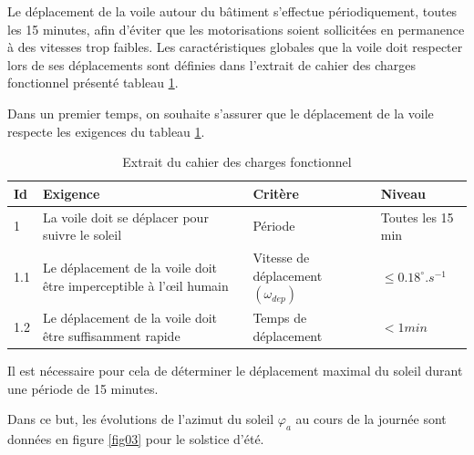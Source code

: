 Le déplacement de la voile autour du bâtiment s'effectue périodiquement, toutes les 15 minutes, afin d'éviter que les motorisations soient sollicitées en permanence à des vitesses trop faibles. Les caractéristiques globales que la voile doit respecter lors de ses déplacements sont définies dans l'extrait de cahier des charges fonctionnel présenté tableau \ref{tab01}.

Dans un premier temps, on souhaite s'assurer que le déplacement de la voile respecte les exigences du tableau \ref{tab01}.

\begin{table}[ht!]
\begin{tabular}{|p{}|p{}|p{}|p{}|}
\hline
Id & Exigence & Critère & Niveau\\
\hline
1 & La voile doit se déplacer pour suivre le soleil & Période & Toutes les 15 min\\
\hline
1.1 & Le déplacement de la voile doit être imperceptible à l'\oe il humain & Vitesse de déplacement $(\omega_{dep})$ & $\leq 0.18^{\circ}.s^{-1}$ \\
\hline
1.2 & Le déplacement de la voile doit être suffisamment rapide & Temps de déplacement & $<1min$\\
\hline
\end{tabular}
\caption{\label{tab01}Extrait du cahier des charges fonctionnel}
\end{table}

Il est nécessaire pour cela de déterminer le déplacement maximal du soleil durant une période de 15 minutes.

Dans ce but, les évolutions de l'azimut du soleil $\varphi_a$ au cours de la journée sont données en figure \ref{fig03} pour le solstice d'été.



